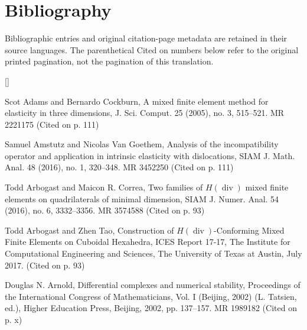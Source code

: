 \clearpage\section*{{Bibliography}}\label{back:bibliography}
{Bibliographic entries and original citation-page metadata are retained in their source languages. The parenthetical Cited on numbers below refer to the original printed pagination, not the pagination of this translation.}
\begin{list}{[]}{\setlength{\leftmargin}{2.7em}\setlength{\labelwidth}{2.2em}}\small

\item\label{bib:source-1}Scot Adams and Bernardo Cockburn, A mixed finite element method for elasticity in three dimensions, J. Sci. Comput. 25 (2005), no. 3, 515–521. MR 2221175 (Cited on p. 111)

\item\label{bib:source-2}Samuel Amstutz and Nicolas Van Goethem, Analysis of the incompatibility operator and application in intrinsic elasticity with dislocations, SIAM J. Math. Anal. 48 (2016), no. 1, 320–348. MR 3452250 (Cited on p. 111)

\item\label{bib:source-3}Todd Arbogast and Maicon R. Correa, Two families of $H(\operatorname{div})$ mixed finite elements on quadrilaterals of minimal dimension, SIAM J. Numer. Anal. 54 (2016), no. 6, 3332–3356. MR 3574588 (Cited on p. 93)

\item\label{bib:source-4}Todd Arbogast and Zhen Tao, Construction of $H(\operatorname{div})$-Conforming Mixed Finite Elements on Cuboidal Hexahedra, ICES Report 17-17, The Institute for Computational Engineering and Sciences, The University of Texas at Austin, July 2017. (Cited on p. 93)

\item\label{bib:source-5}Douglas N. Arnold, Differential complexes and numerical stability, Proceedings of the International Congress of Mathematicians, Vol. I (Beijing, 2002) (L. Tatsien, ed.), Higher Education Press, Beijing, 2002, pp. 137–157. MR 1989182 (Cited on p. x)


\end{list}
